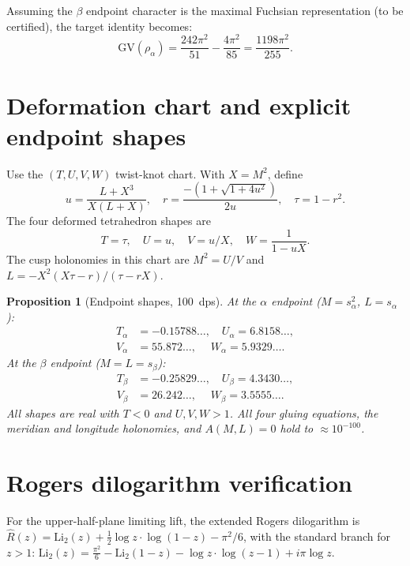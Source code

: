 \documentclass[11pt]{article}
\newtheorem{proposition}[theorem]{Proposition}
\theoremstyle{remark}
\begin{document}
Assuming the $\beta$ endpoint character is the maximal
Fuchsian representation (to be certified), the target
identity becomes:
\begin{equation}\label{eq:gv-alpha}
\mathrm{GV}(\rho_\alpha) = \frac{242\pi^2}{51}
- \frac{4\pi^2}{85} = \frac{1198\pi^2}{255}.
\end{equation}

\section{Deformation chart and explicit endpoint shapes}

Use the $(T,U,V,W)$ twist-knot chart.  With $X = M^2$, define
\begin{equation}\label{eq:u-chart}
u = \frac{L + X^3}{X(L + X)}, \quad
r = \frac{-(1 + \sqrt{1 + 4u^2})}{2u}, \quad
\tau = 1 - r^2.
\end{equation}
The four deformed tetrahedron shapes are
\begin{equation}\label{eq:shapes}
T = \tau, \quad U = u, \quad V = u/X, \quad W = \frac{1}{1-uX}.
\end{equation}
The cusp holonomies in this chart are
$M^2 = U/V$ and
$L = -X^2(X\tau - r)/(\tau - rX)$.

\begin{proposition}[Endpoint shapes, 100~dps]\label{prop:shapes}
At the $\alpha$ endpoint ($M = s_\alpha^2$, $L = s_\alpha$):
\begin{align*}
T_\alpha &= -0.15788\ldots, \quad
U_\alpha = 6.8158\ldots, \\
V_\alpha &= 55.872\ldots, \quad\;
W_\alpha = 5.9329\ldots.
\end{align*}
At the $\beta$ endpoint ($M = L = s_\beta$):
\begin{align*}
T_\beta &= -0.25829\ldots, \quad
U_\beta = 4.3430\ldots, \\
V_\beta &= 26.242\ldots, \quad\;
W_\beta = 3.5555\ldots.
\end{align*}
All shapes are real with $T < 0$ and $U,V,W > 1$.
All four gluing equations, the meridian and longitude
holonomies, and $A(M,L) = 0$ hold to $\approx 10^{-100}$.
\end{proposition}

\section{Rogers dilogarithm verification}

For the upper-half-plane limiting lift,
the extended Rogers dilogarithm is
$\hat{R}(z) = \mathrm{Li}_2(z)
+ \tfrac{1}{2}\log z\cdot\log(1-z) - \pi^2/6$,
with the standard branch for $z > 1$:
$\mathrm{Li}_2(z) = \frac{\pi^2}{6} - \mathrm{Li}_2(1-z)
- \log z\cdot\log(z-1) + i\pi\log z$.
\end{document}
